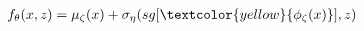 \documentclass[preview]{standalone}
\begin{document}
\begin{align*}
f_\theta (x,z) =  \mu_{\zeta}(x) + \sigma_{\eta}(sg[\textcolor{yellow}{\phi_\zeta (x)}],z)
\end{align*}
\end{document}
